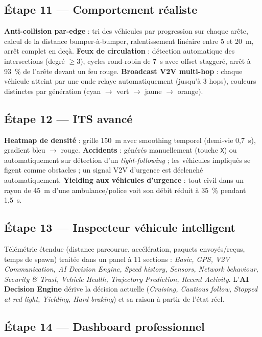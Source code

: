 \documentclass[a4paper,11pt]{article}
\begin{document}
\subsection*{\'Etape 11 — Comportement r\'ealiste}

\textbf{Anti-collision par-edge} : tri des v\'ehicules par progression sur
chaque ar\^ete, calcul de la distance bumper-\`a-bumper, ralentissement
lin\'eaire entre 5 et 20~m, arr\^et complet en de\c{c}\`a.
\textbf{Feux de circulation} : d\'etection automatique des intersections
(degr\'e $\geq 3$), cycles rond-robin de 7~s avec offset stagger\'e, arr\^et
\`a 93~\% de l'ar\^ete devant un feu rouge.
\textbf{Broadcast V2V multi-hop} : chaque v\'ehicule atteint par une onde
relaye automatiquement (jusqu'\`a 3 hops), couleurs distinctes par
g\'en\'eration (cyan $\rightarrow$ vert $\rightarrow$ jaune $\rightarrow$ orange).

\subsection*{\'Etape 12 — ITS avanc\'e}

\textbf{Heatmap de densit\'e} : grille 150~m avec smoothing temporel (demi-vie
0{,}7~s), gradient bleu $\rightarrow$ rouge.
\textbf{Accidents} : g\'en\'er\'es manuellement (touche \texttt{X}) ou
automatiquement sur d\'etection d'un \emph{tight-following} ; les v\'ehicules
impliqu\'es se figent comme obstacles ; un signal V2V d'urgence est
d\'eclench\'e automatiquement.
\textbf{Yielding aux v\'ehicules d'urgence} : tout civil dans un rayon de
45~m d'une ambulance/police voit son d\'ebit r\'eduit \`a 35~\% pendant
1{,}5~s.

\subsection*{\'Etape 13 — Inspecteur v\'ehicule intelligent}

T\'el\'em\'etrie \'etendue (distance parcourue, acc\'el\'eration, paquets
envoy\'es/re\c{c}us, temps de spawn) trait\'ee dans un panel \`a 11 sections :
\textit{Basic, GPS, V2V Communication, AI Decision Engine, Speed history,
Sensors, Network behaviour, Security \& Trust, Vehicle Health, Trajectory
Prediction, Recent Activity}. L'\textbf{AI Decision Engine} d\'erive la
d\'ecision actuelle (\textit{Cruising, Cautious follow, Stopped at red light,
Yielding, Hard braking}) et sa raison \`a partir de l'\'etat r\'eel.

\subsection*{\'Etape 14 — Dashboard professionnel}
\end{document}
